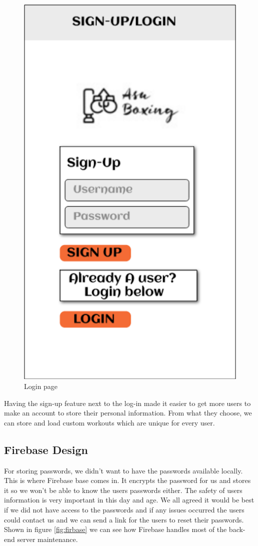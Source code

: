 \documentclass[a4paper,12pt]{report}
\begin{document}
\begin{figure}[h]
\begin{center}
\includegraphics[scale=.5]{images/loginPageBorder.png}
\end{center}
\caption{Login page}
\label{fig:LazyLoading}
\end{figure}

Having the sign-up feature next to the log-in made it easier to get more users to make an account to store their personal information. From what they choose, we can store and load custom workouts which are unique for every user. 
\subsection{Firebase Design}
For storing passwords, we didn't want to have the passwords available locally. This is where Firebase base comes in. It encrypts the password for us and stores it so we won't be able to know the users passwords either. The safety of users information is very important in this day and age. We all agreed it would be best if we did not have access to the passwords and if any issues occurred the users could contact us and we can send a link for the users to reset their passwords. Shown in figure \ref{fig:firbase} we can see how Firebase handles most of the back-end server maintenance.
\end{document}

